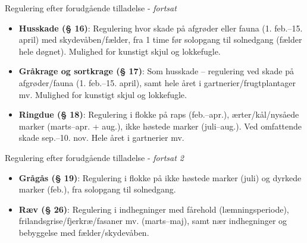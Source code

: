 \begin{frame}{Regulering efter forudgående tilladelse - \textit{fortsat}}

\vspace{1em}

\small

\raggedright

\begin{itemize}
\itemsep0.6em

\item \textbf{Husskade (§ 16)}: Regulering hvor skade på afgrøder eller fauna (1. feb.–15. april) med skydevåben/fælder, fra 1 time før solopgang til solnedgang (fælder hele døgnet). Mulighed for kunstigt skjul og lokkefugle.

\item \textbf{Gråkrage og sortkrage (§ 17)}: Som husskade – regulering ved skade på afgrøder/fauna (1. feb.–15. april), samt hele året i gartnerier/frugtplantager mv. Mulighed for kunstigt skjul og lokkefugle.

\item \textbf{Ringdue (§ 18)}: Regulering i flokke på raps (feb.–apr.), ærter/kål/nysåede marker (marts–apr. + aug.), ikke høstede marker (juli–aug.). Ved omfattende skade sep.–10. nov. Hele året i gartnerier mv.

\end{itemize}

\end{frame}

\begin{frame}{Regulering efter forudgående tilladelse - \textit{fortsat 2}}

\vspace{1em}

\small

\raggedright

\begin{itemize}
\itemsep0.6em

\item \textbf{Grågås (§ 19)}: Regulering i flokke på ikke høstede marker (juli) og dyrkede marker (feb.), fra solopgang til solnedgang.

\item \textbf{Ræv (§ 26)}: Regulering i indhegninger med fårehold (læmningsperiode), frilandsgrise/fjerkræ/fasaner mv. (marts–maj), samt nær indhegninger og bebyggelse med fælder/skydevåben.

\end{itemize}

\end{frame}


